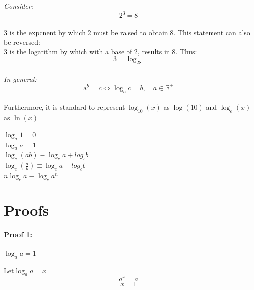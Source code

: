\documentclass[12pt, a4paper]{report}
\theoremstyle{definition}
\begin{document}
	\emph{Consider: }\\$$ 2^3 = 8$$\\
	
	3 is the exponent by which 2 must be raised to obtain 8. This statement can also be reversed:\\ 3 is the logarithm by which with a base of 2, results in 8. Thus:$$ 3 = \log_28$$\\
	
	\emph{In general: }\\$$a^b = c \iff \log_ac = b ,\quad a \in \mathbb{R^+}$$\\
	
	
	Furthermore, it is standard to represent $\log_{10}(x)$ as $\log(10) $ and $ \log_e(x) $ as $ \ln(x) $
	
	
	\bigskip
	\bigskip
	\bigskip
	\bigskip
	
	\begin{center}
		\begin{tcolorbox}[center title,hbox,    %
			lifted shadow={1mm}{-2mm}{3mm}{0.1mm}%
			{black!50!white}]
			\begin{varwidth}{\textwidth}
				\begin{center}
					$	\log_a1                         = 0                    $ \\
					\bigskip
					$\log_aa                          = 1                    $ \\
					\bigskip
					$	\log_c(ab)                       \equiv \log_ca + log_cb $\\
					\bigskip
					$	\log_c\left (\frac{a}{b}\right)  \equiv \log_ca - log_cb$ \\
					\bigskip
					$	n\log_ca                         \equiv \log_ca^n   $     
				\end{center}
			\end{varwidth}
		\end{tcolorbox} 
	\end{center}
	\section{Proofs}
	
	
	
	\paragraph{Proof 1: }$\log_aa  = 1$
	\begin{center}
		$	\text{Let} \log_aa = x$
		$$   a^x      = a $$
		$$x        =1 $$
	\end{center}
\end{document}

